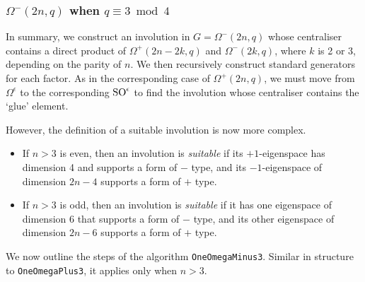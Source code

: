 \documentclass[12pt]{article}
\def\SO{{\rm SO}}
\begin{document}
\subsubsection{$\Omega^-(2n,q)$ when $q\equiv3\bmod4$}
In summary, we construct an involution in $G=\Omega^-(2n,q)$ 
whose centraliser
contains a direct product of $\Omega^+(2n-2k,q)$ and $\Omega^-(2k,q)$,
where $k$ is 2 or 3, depending on the parity of $n$. 
We then recursively construct standard generators for each factor. 
As in the corresponding case of $\Omega^+(2n,q)$, 
we must move from $\Omega^\epsilon$ to 
the corresponding $\SO^\epsilon$ to find
the involution whose centraliser contains the `glue' element. 

However, the definition of a suitable involution is now more complex.
\begin{itemize}
\item 
If $n > 3$ is even, then an involution is {\it suitable} if its 
$+1$-eigenspace has dimension 4 and supports a form of $-$ type, and 
its $-1$-eigenspace of dimension $2n-4$ supports a form of $+$ type.  
\item 
If $n>3$ is odd, then 
an involution is {\it suitable} if it has one eigenspace of dimension 6 
that supports a form of $-$ type, and its other eigenspace of dimension
$2n-6$ supports a form of $+$ type.
\end{itemize}

We now outline the steps of the algorithm {\tt OneOmegaMinus3}.
Similar in structure to {\tt OneOmegaPlus3}, it applies only when $n > 3$.
\end{document}

